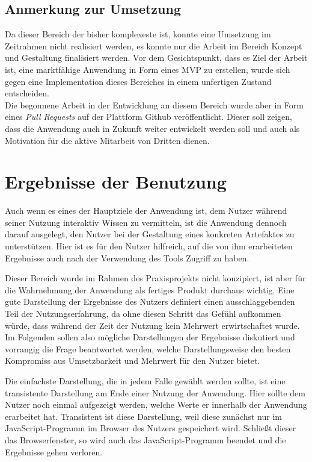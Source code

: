 \subsection{Anmerkung zur Umsetzung}
\label{chap:grid_dev}
Da dieser Bereich der bisher komplexeste ist, konnte eine Umsetzung im Zeitrahmen nicht realisiert werden, es konnte nur die Arbeit im Bereich Konzept und Gestaltung finalisiert werden.
 Vor dem Gesichtspunkt, dass es Ziel der Arbeit ist, eine marktfähige Anwendung in Form eines MVP zu erstellen, wurde sich gegen eine Implementation dieses Bereiches in einem unfertigen Zustand entscheiden.\\
Die begonnene Arbeit in der Entwicklung an diesem Bereich wurde aber in Form eines \textit{Pull Requests} auf der Plattform Github veröffentlicht. Dieser soll zeigen, dass die Anwendung auch in Zukunft weiter entwickelt werden soll und auch als Motivation für die aktive Mitarbeit von Dritten dienen.

\section{Ergebnisse der Benutzung}
\label{chap:results}
Auch wenn es eines der Hauptziele der Anwendung ist, dem Nutzer während seiner Nutzung interaktiv Wissen zu vermitteln, ist die Anwendung dennoch darauf ausgelegt, den Nutzer bei der Gestaltung eines konkreten Artefaktes zu unterstützen. Hier ist es für den Nutzer hilfreich, auf die von ihm erarbeiteten Ergebnisse auch nach der Verwendung des Tools Zugriff zu haben.

Dieser Bereich wurde im Rahmen des Praxisprojekts nicht konzipiert, ist aber für die Wahrnehmung der Anwendung als fertiges Produkt durchaus wichtig. Eine gute Darstellung der Ergebnisse des Nutzers definiert einen ausschlaggebenden Teil der Nutzungserfahrung, da ohne diesen Schritt das Gefühl aufkommen würde, dass während der Zeit der Nutzung kein Mehrwert erwirtschaftet wurde.
Im Folgenden sollen also mögliche Darstellungen der Ergebnisse diskutiert und vorrangig die Frage beantwortet werden, welche Darstellungsweise den besten Kompromiss aus Umsetzbarkeit und Mehrwert für den Nutzer bietet.

Die einfachste Darstellung, die in jedem Falle gewählt werden sollte, ist eine transistente Darstellung am Ende einer Nutzung der Anwendung. Hier sollte dem Nutzer noch einmal aufgezeigt werden, welche Werte er innerhalb der Anwendung erarbeitet hat. Transistent ist diese Darstellung, weil diese zunächst nur im JavaScript-Programm im Browser des Nutzers gespeichert wird. Schließt dieser das Browserfenster, so wird auch das JavaScript-Programm beendet und die Ergebnisse gehen verloren.

